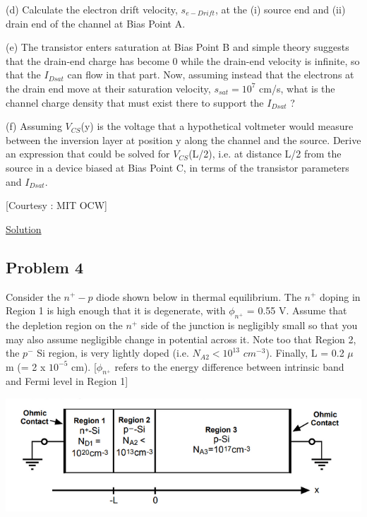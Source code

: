 \documentclass[12 pt]{article}
\begin{document}
(d)  Calculate the electron drift velocity, $s_{e-Drift}$, at the (i) source end and (ii) drain end of the channel at Bias Point A. \par

(e) The transistor enters saturation at Bias Point B and simple theory suggests that the drain-end charge has become 0 while the drain-end velocity is infinite, so that the $I_{Dsat}$ can flow in that part. Now, assuming instead that the electrons at the drain end move at their saturation velocity, $s_{sat} = 10^{7}$ cm/s, what is the channel charge density that must exist there to support the $I_{Dsat}$ ? \par

(f)  Assuming $V_{CS}$(y) is the voltage that a hypothetical voltmeter would measure between the inversion layer at position y along the channel and the source. Derive an expression that could be solved for $V_{CS}$(L/2), i.e. at distance L/2 from the source in a device biased at Bias Point C, in terms of the transistor parameters and $I_{Dsat}$. \par

\hspace{12 cm}[Courtesy : MIT OCW]

\href{https://drive.google.com/file/d/13Ysh57hD2lzxWlqpqbpQ9mMU5Yj2v9dc/view?usp=sharing}{Solution}

\subsection{Problem 4}

Consider the $n^{+}-p$ diode shown below in thermal equilibrium. The $n^{+}$ doping in Region 1 is high enough that it is degenerate, with $\phi_{n^{+}}$ = 0.55 V. Assume that the depletion region on the $n^{+}$ side of the junction is negligibly small so that you may also assume negligible change in potential across it. Note too that Region 2, the $p^{-}$ Si region, is very lightly doped (i.e. $N_{A2} < 10^{13}$ $cm^{-3}$). Finally, L = 0.2 $\mu$m (= 2 x $10^{-5}$ cm). [$\phi_{n^{+}}$ refers to the energy difference between intrinsic band and Fermi level in Region 1]  \par

\par
\begin{center}
    \includegraphics{Problem_4.png}
\end{center}
\par
\end{document}
